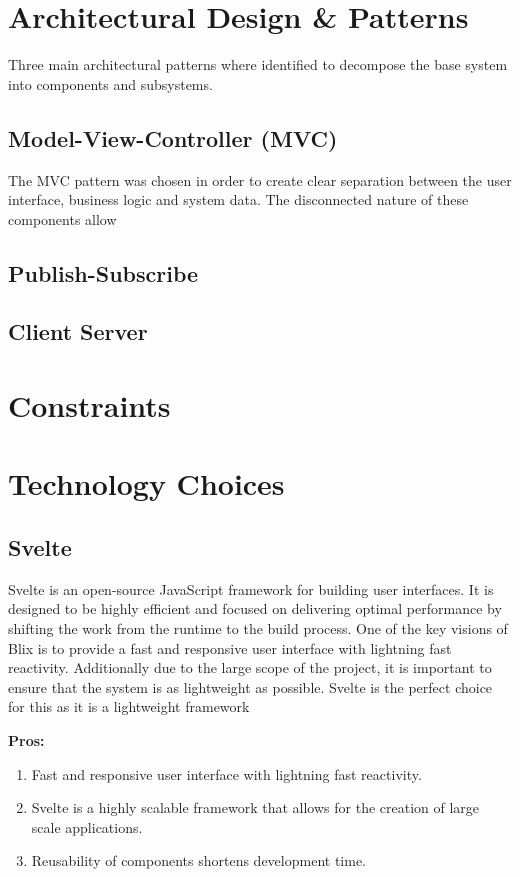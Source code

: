 \documentclass[11pt,a4paper]{article}
\begin{document}
\section{Architectural Design \& Patterns}
Three main architectural patterns where identified to decompose the base system
into components and subsystems.

\subsection{Model-View-Controller (MVC)}
The MVC pattern was chosen in order to create clear separation between the user
interface, business logic and system data. The disconnected nature of these
components allow 


\subsection{Publish-Subscribe}


\subsection{Client Server}


\section{Constraints}


\section{Technology Choices}

\subsection{Svelte}
Svelte is an open-source JavaScript framework for building user interfaces. It
is designed to be highly efficient and focused on delivering optimal performance
by shifting the work from the runtime to the build process. One of the key
visions of Blix is to provide a fast and responsive user interface with
lightning fast reactivity. Additionally due to the large scope of the project,
it is important to ensure that the system is as lightweight as possible. Svelte
is the perfect choice for this as it is a lightweight framework

\textbf{Pros:}
\begin{enumerate}[label*=\arabic*.]
	\item[\textbullet] Fast and responsive user interface with lightning fast reactivity. 
	\item[\textbullet] Svelte is a highly scalable framework that allows for the creation of large scale applications.
	\item[\textbullet] Reusability of components shortens development time.
\end{enumerate}
\end{document}

